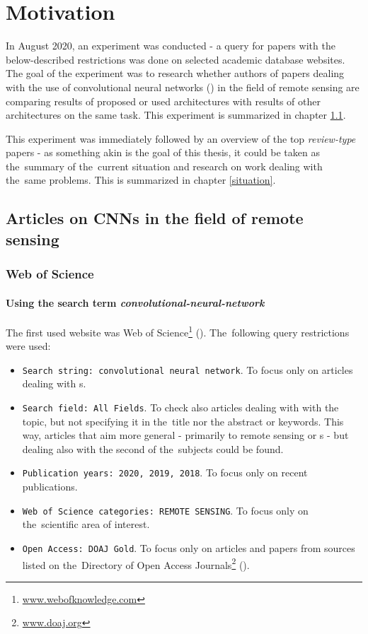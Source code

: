 \chapter{Motivation}
\label{motivation}

In August 2020, an experiment was conducted - a query for papers with the below-described restrictions was done on selected academic database websites. The goal of the experiment was to research whether authors of papers dealing with the use of convolutional neural networks () in the field of remote sensing are comparing results of proposed or used architectures with results of other architectures on the same task. This experiment is summarized in chapter \ref{top-papers}.

This experiment was immediately followed by an overview of the top \textit{review-type} papers - as something akin is the goal of this thesis, it could be taken as the~summary of the~current situation and research on work dealing with the~same problems. This is summarized in chapter \ref{situation}.

\section{Articles on CNNs in the field of remote sensing}
\label{top-papers}

\subsection{Web of Science}
\label{wos-papers}

\subsubsection{Using the search term \textit{convolutional-neural-network}}
\label{wos-papers-full-length}

The first used website was Web of Science\footnote{\url{www.webofknowledge.com}} (). The~following query restrictions were used:

\begin{itemize}
	\item \verb|Search string: convolutional neural network|. To focus only on articles dealing with s.
	\item \verb|Search field: All Fields|. To check also articles dealing with with the topic, but not specifying it in the~title nor the abstract or keywords. This way, articles that aim more general - primarily to remote sensing or s - but dealing also with the second of the~subjects could be found.
	\item \verb|Publication years: 2020, 2019, 2018|. To focus only on recent publications.
	\item \verb|Web of Science categories: REMOTE SENSING|. To focus only on the~scien\-ti\-fic area of interest.
	\item \verb|Open Access: DOAJ Gold|. To focus only on articles and papers from sources listed on the~Di\-rectory of Open Access Journals\footnote{\url{www.doaj.org}} ().
\end{itemize}

